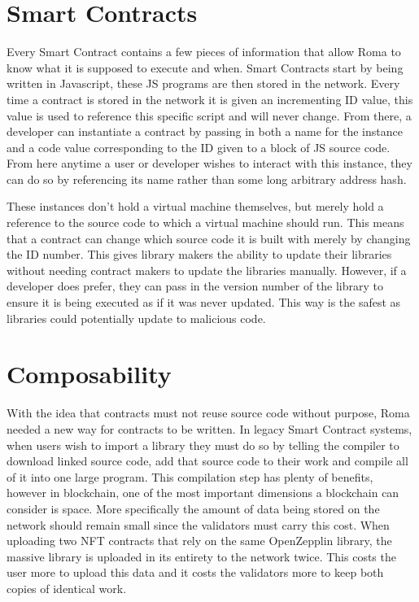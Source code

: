 \documentclass[a4paper]{article}
\begin{document}
\section{Smart Contracts}
Every Smart Contract contains a few pieces of information that allow Roma to know what it is supposed to execute and when. Smart Contracts start by being written in Javascript, these JS programs are then stored in the network. Every time a contract is stored in the network it is given an incrementing ID value, this value is used to reference this specific script and will never change. From there, a developer can instantiate a contract by passing in both a name for the instance and a code value corresponding to the ID given to a block of JS source code. From here anytime a user or developer wishes to interact with this instance, they can do so by referencing its name rather than some long arbitrary address hash.

These instances don't hold a virtual machine themselves, but merely hold a reference to the source code to which a virtual machine should run. This means that a contract can change which source code it is built with merely by changing the ID number. This gives library makers the ability to update their libraries without needing contract makers to update the libraries manually. However, if a developer does prefer, they can pass in the version number of the library to ensure it is being executed as if it was never updated. This way is the safest as libraries could potentially update to malicious code.

\section{Composability}
With the idea that contracts must not reuse source code without purpose, Roma needed a new way for contracts to be written. In legacy Smart Contract systems, when users wish to import a library they must do so by telling the compiler to download linked source code, add that source code to their work and compile all of it into one large program. This compilation step has plenty of benefits, however in blockchain, one of the most important dimensions a blockchain can consider is space. More specifically the amount of data being stored on the network should remain small since the validators must carry this cost. When uploading two NFT contracts that rely on the same OpenZepplin library, the massive library is uploaded in its entirety to the network twice. This costs the user more to upload this data and it costs the validators more to keep both copies of identical work.
\end{document}

